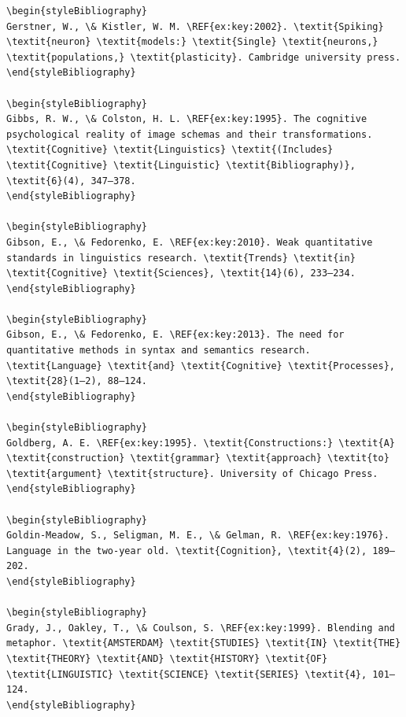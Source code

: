 \begin{verbatim}
\begin{styleBibliography}
Gerstner, W., \& Kistler, W. M. \REF{ex:key:2002}. \textit{Spiking} \textit{neuron} \textit{models:} \textit{Single} \textit{neurons,} \textit{populations,} \textit{plasticity}. Cambridge university press.
\end{styleBibliography}

\begin{styleBibliography}
Gibbs, R. W., \& Colston, H. L. \REF{ex:key:1995}. The cognitive psychological reality of image schemas and their transformations. \textit{Cognitive} \textit{Linguistics} \textit{(Includes} \textit{Cognitive} \textit{Linguistic} \textit{Bibliography)}, \textit{6}(4), 347–378.
\end{styleBibliography}

\begin{styleBibliography}
Gibson, E., \& Fedorenko, E. \REF{ex:key:2010}. Weak quantitative standards in linguistics research. \textit{Trends} \textit{in} \textit{Cognitive} \textit{Sciences}, \textit{14}(6), 233–234.
\end{styleBibliography}

\begin{styleBibliography}
Gibson, E., \& Fedorenko, E. \REF{ex:key:2013}. The need for quantitative methods in syntax and semantics research. \textit{Language} \textit{and} \textit{Cognitive} \textit{Processes}, \textit{28}(1–2), 88–124.
\end{styleBibliography}

\begin{styleBibliography}
Goldberg, A. E. \REF{ex:key:1995}. \textit{Constructions:} \textit{A} \textit{construction} \textit{grammar} \textit{approach} \textit{to} \textit{argument} \textit{structure}. University of Chicago Press.
\end{styleBibliography}

\begin{styleBibliography}
Goldin-Meadow, S., Seligman, M. E., \& Gelman, R. \REF{ex:key:1976}. Language in the two-year old. \textit{Cognition}, \textit{4}(2), 189–202.
\end{styleBibliography}

\begin{styleBibliography}
Grady, J., Oakley, T., \& Coulson, S. \REF{ex:key:1999}. Blending and metaphor. \textit{AMSTERDAM} \textit{STUDIES} \textit{IN} \textit{THE} \textit{THEORY} \textit{AND} \textit{HISTORY} \textit{OF} \textit{LINGUISTIC} \textit{SCIENCE} \textit{SERIES} \textit{4}, 101–124.
\end{styleBibliography}


\end{verbatim}
